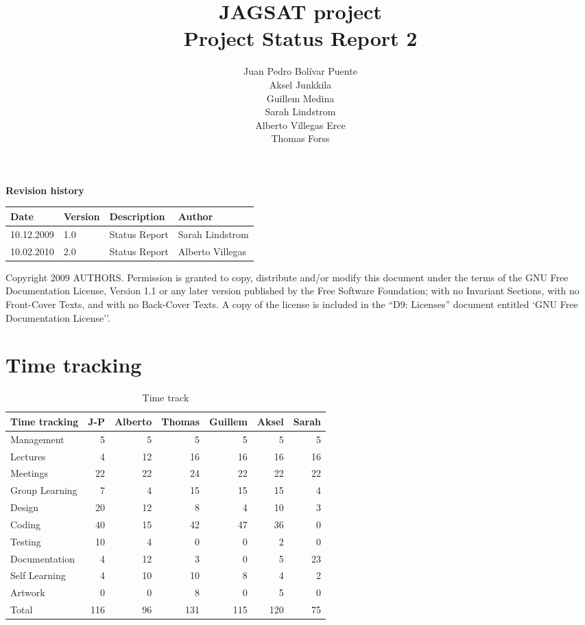 \documentclass[12pt,a4paper]{article}
\title{\large JAGSAT project\\\huge Project Status Report 2}
\author{
  Juan Pedro Bolívar Puente\\ 
  Aksel Junkkila\\
  Guillem Medina\\ 
  Sarah Lindstrom\\ 
  Alberto Villegas Erce\\ 
  Thomas Forss
}
\begin{document}
\maketitle

\begin{center}
\textbf{Revision history}

\begin{tabular}{ l | l | l | l }
Date			&Version	&Description		&Author\\\hline\hline
10.12.2009	&1.0		&Status Report		&Sarah Lindstrom\\
10.02.2010	&2.0		&Status Report		&Alberto Villegas
\end{tabular}
\label{tab:rev}
\end{center}

\vfill
Copyright 2009 AUTHORS.
Permission is granted to copy, distribute and/or modify this document under the terms of the GNU Free Documentation License, Version 1.1 or any later version published by the Free Software Foundation;  with no Invariant Sections, with no Front-Cover Texts, and with no Back-Cover Texts. A copy of the license is included in the ``D9: Licenses''  document entitled `GNU Free Documentation License''.

\pagebreak
\tableofcontents
\pagebreak

\section{Time tracking}

\begin{table}[h!]
\small
\begin{tabular}{ l | r | r | r | r | r | r}
Time tracking	&J-P	&Alberto	&Thomas	&Guillem	&Aksel	&Sarah\\\hline\hline
Management	&5	&5		&5		&5		&5		&5\\
Lectures		&4	&12		&16		&16		&16		&16\\
Meetings		&22	&22		&24		&22		&22		&22\\
Group Learning&7	&4		&15		&15		&15		&4\\
Design		&20	&12		&8		&4		&10		&3\\
Coding		&40	&15		&42		&47		&36		&0\\
Testing		&10	&4		&0		&0		&2		&0\\
Documentation&4	&12		&3		&0		&5		&23\\
Self Learning	&4	&10		&10		&8		&4		&2\\
Artwork		&0	&0		&8		&0		&5		&0\\
Total			&116&96		&131	&115	&120	&75
\end{tabular}
\caption{Time track}
\label{tab:timetrack}
\end{table}
\end{document}
